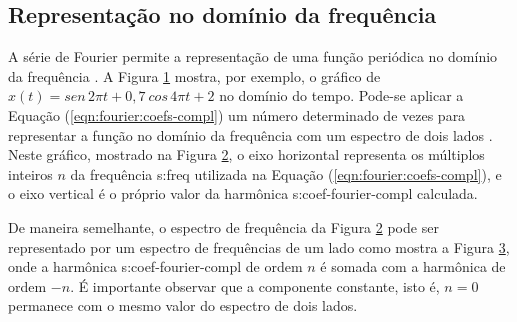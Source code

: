 \documentclass[12pt,openright,oneside,a4paper,
	chapter=TITLE,section=TITLE,
	english,brazil]{abntex2}
\begin{document}
	\subsection{Representação no domínio da frequência}
	A série de Fourier permite a representação de uma função periódica no domínio da frequência \cite{rao:2008}. A Figura \ref{fig:funcao-periodica} mostra, por exemplo, o gráfico de $ x(t) = sen\,2\pi t + 0,\!7\:cos\,4\pi t + 2 $ no domínio do tempo. Pode-se aplicar a Equação (\ref{eqn:fourier:coefs-compl}) um número determinado de vezes para representar a função no domínio da frequência com um espectro de dois lados \cite{dimarogonas:1995}. Neste gráfico, mostrado na Figura \ref{fig:espectro-2sided}, o eixo horizontal representa os múltiplos inteiros $ n $ da frequência \gls{s:freq} utilizada na Equação (\ref{eqn:fourier:coefs-compl}), e o eixo vertical é o próprio valor da harmônica \gls{s:coef-fourier-compl} calculada.
	\begin{figure}[b]
		\label{fig:funcao-periodica}
	\end{figure}
	\begin{figure}[t]
		\label{fig:espectro-2sided}
	\end{figure}
	
	De maneira semelhante, o espectro de frequência da Figura \ref{fig:espectro-2sided} pode ser representado por um espectro de frequências de um lado \cite{randall:1987} como mostra a Figura \ref{fig:espectro-1sided}, onde a harmônica \gls{s:coef-fourier-compl} de ordem $ n $ é somada com a harmônica de ordem $ -n $. É importante observar que a componente constante, isto é, $ n=0 $ permanece com o mesmo valor do espectro de dois lados.
	\begin{figure}[t]
		\label{fig:espectro-1sided}
	\end{figure}
	
\end{document}
